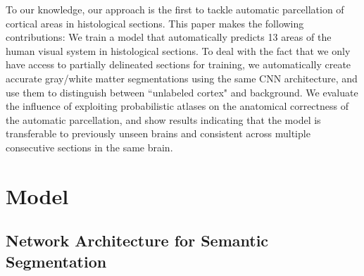 \documentclass{article}
\newcommand\todo[1]{\textcolor{red}{#1}}
\begin{document}
To our knowledge, our approach is the first to tackle automatic parcellation of cortical areas in histological sections. 
This paper makes the following contributions: 
We train a model that automatically predicts 13 areas of the human visual system in histological sections.
To deal with the fact that we only have access to partially delineated sections for training,
we automatically create accurate gray/white matter segmentations using the same CNN architecture, 
and use them to distinguish between ``unlabeled cortex" and background.
We evaluate the influence of exploiting probabilistic atlases on the anatomical correctness of the automatic parcellation, and show results indicating that the model is transferable to previously unseen brains and consistent across multiple consecutive sections in the same brain.



\section{Model}
\label{sec:arch}
%
\subsection{Network Architecture for Semantic Segmentation}
\label{sec:arch:arch}
\vspace*{-.5\baselineskip}
\end{document}
